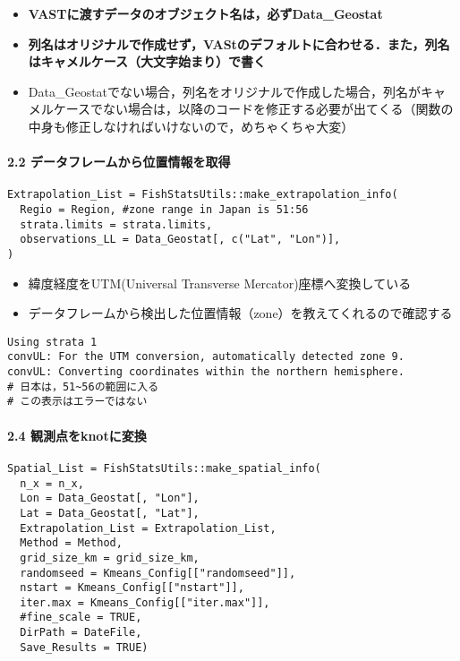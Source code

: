 \documentclass[]{article}
\providecommand{\tightlist}{%
  \setlength{\itemsep}{0pt}\setlength{\parskip}{0pt}}
\let\oldparagraph\paragraph
\renewcommand{\paragraph}[1]{\oldparagraph{#1}\mbox{}}
\begin{document}
\begin{itemize}
\tightlist
\item
  \textbf{VASTに渡すデータのオブジェクト名は，必ずData\_Geostat}
\item
  \textbf{列名はオリジナルで作成せず，VAStのデフォルトに合わせる．また，列名はキャメルケース（大文字始まり）で書く}
\item
  Data\_Geostatでない場合，列名をオリジナルで作成した場合，列名がキャメルケースでない場合は，以降のコードを修正する必要が出てくる（関数の中身も修正しなければいけないので，めちゃくちゃ大変）
\end{itemize}

\hypertarget{ux30c7ux30fcux30bfux30d5ux30ecux30fcux30e0ux304bux3089ux4f4dux7f6eux60c5ux5831ux3092ux53d6ux5f97}{%
\paragraph{2.2
データフレームから位置情報を取得}\label{ux30c7ux30fcux30bfux30d5ux30ecux30fcux30e0ux304bux3089ux4f4dux7f6eux60c5ux5831ux3092ux53d6ux5f97}}

\begin{verbatim}
Extrapolation_List = FishStatsUtils::make_extrapolation_info(
  Regio = Region, #zone range in Japan is 51:56
  strata.limits = strata.limits,
  observations_LL = Data_Geostat[, c("Lat", "Lon")],
)
\end{verbatim}

\begin{itemize}
\tightlist
\item
  緯度経度をUTM(Universal Transverse Mercator)座標へ変換している
\item
  データフレームから検出した位置情報（zone）を教えてくれるので確認する
\end{itemize}

\begin{verbatim}
Using strata 1
convUL: For the UTM conversion, automatically detected zone 9.   
convUL: Converting coordinates within the northern hemisphere.
# 日本は，51~56の範囲に入る
# この表示はエラーではない
\end{verbatim}

\hypertarget{ux89b3ux6e2cux70b9ux3092knotux306bux5909ux63db}{%
\paragraph{2.4
観測点をknotに変換}\label{ux89b3ux6e2cux70b9ux3092knotux306bux5909ux63db}}

\begin{verbatim}
Spatial_List = FishStatsUtils::make_spatial_info(
  n_x = n_x,
  Lon = Data_Geostat[, "Lon"],
  Lat = Data_Geostat[, "Lat"],
  Extrapolation_List = Extrapolation_List,
  Method = Method,
  grid_size_km = grid_size_km,
  randomseed = Kmeans_Config[["randomseed"]],
  nstart = Kmeans_Config[["nstart"]],
  iter.max = Kmeans_Config[["iter.max"]],
  #fine_scale = TRUE,
  DirPath = DateFile,
  Save_Results = TRUE)
\end{verbatim}
\end{document}
